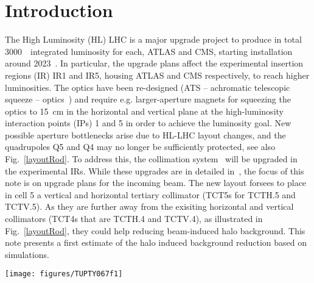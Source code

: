 \section{Introduction}
The High Luminosity (HL) LHC is a major upgrade project to produce in total 3000~\ifb~integrated luminosity for each, ATLAS and CMS, starting installation around 2023~\cite{HLLHCWebRef}. In particular, the upgrade plans affect the experimental insertion regions (IR) IR1 and IR5, housing ATLAS and CMS respectively, to reach higher luminosities. The optics have been re-designed (ATS -- achromatic telescopic squeeze -- optics~\cite{ATSref}) and require e.g. larger-aperture magnets for squeezing the optics to 15~cm in the horizontal and vertical plane at the high-luminosity interaction points (IPs) 1 and 5 in order to achieve the luminosity goal. New possible aperture bottlenecks arise due to HL-LHC layout changes, and the quadrupoles Q5 and Q4 may no longer be sufficiently protected, see also Fig.~\ref{layoutRod}. To address this, the collimation system~\cite{LHCDesignRep,collRef} will be upgraded in the experimental IRs. While these upgrades are in detailed in~\cite{layoutProcRod}, the focus of this note is on upgrade plans for the incoming beam. The new layout forsees to place in cell 5 a vertical and horizontal tertiary collimator (TCT5s for TCTH.5 and TCTV.5). As they are further away from the exisiting horizontal and vertical collimators (TCT4s that are TCTH.4 and TCTV.4), as illustrated in Fig.~\ref{layoutRod}, they could help reducing beam-induced halo background. This note presents a first estimate of the halo induced background reduction based on simulations.

\begin{figure*}[!tbh]
    \centering
    \texttt{[image: figures/TUPTY067f1]}
    \vspace{-0.6cm}
    \caption{Planned HL-LHC layout~\cite{layoutProcRod} for the incoming beam in the experimental insertion region of ATLAS (IP1) with tertiary collimator pairs (TCT4s and TCT5s) highlighted above the beamline. TCT4s are at around 131~m and TCT5s at 213~m. The layout in IR5 is identical.}
    \label{layoutRod}
\end{figure*}
